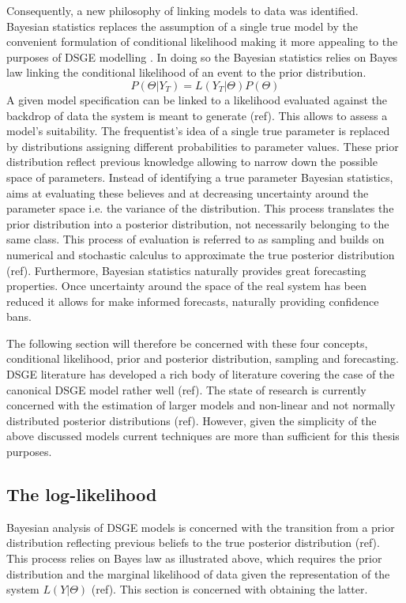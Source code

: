 \documentclass[12pt,a4paper,english]{article} %
\begin{document}
	Consequently, a new philosophy of linking models to data was identified. Bayesian statistics replaces the assumption of a single true model by the convenient formulation of conditional likelihood making it more appealing to the purposes of DSGE modelling \cite{guerron-quintana_bayesian_2013}. In doing so the Bayesian statistics relies on Bayes law linking the conditional likelihood of an event to the prior distribution.
	\[
	P( \Theta | Y_{T}) = L(Y_{T} | \Theta) P(\Theta)
	\]
	A given model specification can be linked to a likelihood evaluated against the backdrop of data the system is meant to generate (ref). This allows to assess a model's suitability. The frequentist's idea of a single true parameter is replaced by distributions assigning different probabilities to parameter values. These prior distribution reflect previous knowledge allowing to narrow down the possible space of parameters. Instead of identifying a true parameter Bayesian statistics, aims at evaluating these believes and at decreasing uncertainty around the parameter space i.e. the variance of the distribution. This process translates the prior distribution into a posterior distribution, not necessarily belonging to the same class. 
	This process of evaluation is referred to as sampling and builds on numerical and stochastic calculus to approximate the true posterior distribution (ref). Furthermore, Bayesian statistics naturally provides great forecasting properties. Once uncertainty around the space of the real system has been reduced it allows for make informed forecasts, naturally providing confidence bans. 
	
	The following section will therefore be concerned with these four concepts, conditional likelihood, prior and posterior distribution, sampling and forecasting. DSGE literature has developed a rich body of literature covering the case of the canonical DSGE model rather well (ref). The state of research is currently concerned with the estimation of larger models and non-linear and not normally distributed posterior distributions (ref). However, given the simplicity of the above discussed models current techniques are more than sufficient for this thesis purposes.
	
	
	\subsection{The log-likelihood}
	
	Bayesian analysis of DSGE models is concerned with the transition from a prior distribution reflecting previous beliefs to the true posterior distribution (ref). This process relies on Bayes law as illustrated above, which requires the prior distribution and the marginal likelihood of data given the representation of the system $L(Y | \Theta)$ (ref). This section is concerned with obtaining the latter.
	
\end{document}
